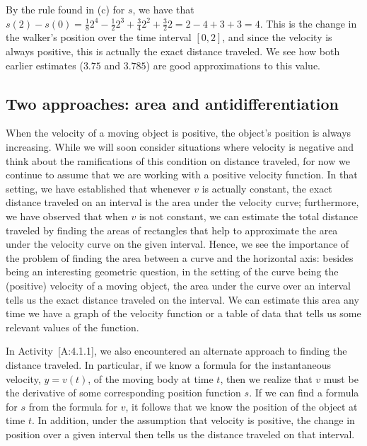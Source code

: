By the rule found in (c) for \(s\), we have that
\(s(2) - s(0) = \frac{1}{8}2^4 - \frac{1}{2}2^3 + \frac{3}{4}2^2 + \frac{3}{2} 2 = 2 - 4 + 3 + 3 = 4\).
This is the change in the walker's position over the time interval
\([0,2]\), and since the velocity is always positive, this is actually
the exact distance traveled. We see how both earlier estimates (\(3.75\)
and \(3.785\)) are good approximations to this value.

\subsection*{Two approaches: area and
antidifferentiation}\label{two-approaches-area-and-antidifferentiation}

When the velocity of a moving object is positive, the object's position
is always increasing. While we will soon consider situations where
velocity is negative and think about the ramifications of this condition
on distance traveled, for now we continue to assume that we are working
with a positive velocity function. In that setting, we have established
that whenever \(v\) is actually constant, the exact distance traveled on
an interval is the area under the velocity curve; furthermore, we have
observed that when \(v\) is not constant, we can estimate the total
distance traveled by finding the areas of rectangles that help to
approximate the area under the velocity curve on the given interval.
Hence, we see the importance of the problem of finding the area between
a curve and the horizontal axis: besides being an interesting geometric
question, in the setting of the curve being the (positive) velocity of a
moving object, the area under the curve over an interval tells us the
exact distance traveled on the interval. We can estimate this area any
time we have a graph of the velocity function or a table of data that
tells us some relevant values of the function.

In Activity~{[}A:4.1.1{]}, we also encountered an alternate approach to
finding the distance traveled. In particular, if we know a formula for
the instantaneous velocity, \(y = v(t)\), of the moving body at time
\(t\), then we realize that \(v\) must be the derivative of some
corresponding position function \(s\). If we can find a formula for
\(s\) from the formula for \(v\), it follows that we know the position
of the object at time \(t\). In addition, under the assumption that
velocity is positive, the change in position over a given interval then
tells us the distance traveled on that interval.

